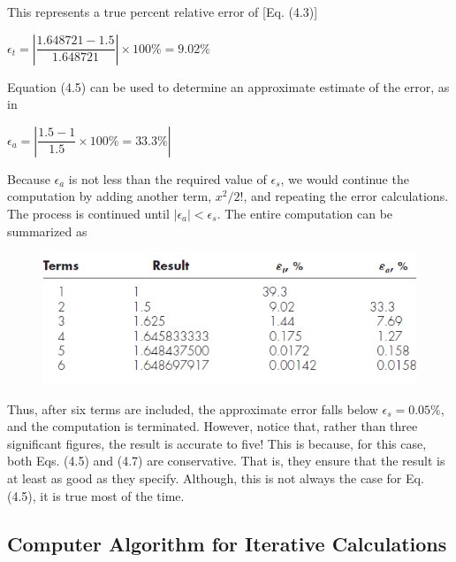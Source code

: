 \documentclass[../main.tex]{subfiles}
\begin{document}
\begin{example}
    \noindent
    This represents a true percent relative error of [Eq. (4.3)]
    \newline

    $\epsilon_t = \left\lvert\dfrac{1.648721-1.5}{1.648721}\right\rvert\times100\%=9.02\%$
    \newline

    \noindent
    Equation (4.5) can be used to determine an approximate estimate of the error, as in
    \newline

    $\epsilon_a = \left\lvert\dfrac{1.5-1}{1.5}\times100\%=33.3\% \right\rvert $
    \newline

    \noindent
    Because ${\epsilon_a}$ is not less than the required value of $\epsilon_s$, we would continue the computation by
    adding another term, $x^2/2!$, and repeating the error calculations. The process is continued
    until $\left\lvert\epsilon_a \right\rvert < \epsilon_s$. The entire computation can be summarized as
    \newline

    \begin{figure}[h]
        \includegraphics{./images/fig_4_1_1}
    \end{figure}

    \noindent
    Thus, after six terms are included, the approximate error falls below $\epsilon_s=0.05\%$, and the
    computation is terminated. However, notice that, rather than three significant figures, the
    result is accurate to five! This is because, for this case, both Eqs. (4.5) and (4.7) are conservative.
    That is, they ensure that the result is at least as good as they specify. Although,
    this is not always the case for Eq. (4.5), it is true most of the time.
\end{example}
\newpage

\subsection{Computer Algorithm for Iterative Calculations}
\end{document}

